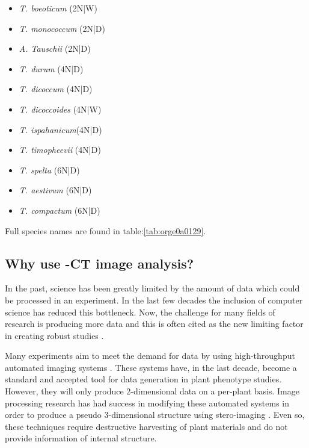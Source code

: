 \documentclass[11pt]{report}
\begin{document}
\begin{multicols}{3}

  \begin{itemize}
  \item{\textit{T. boeoticum} (2N|W)}
  \item{\textit{T. monococcum} (2N|D)}
  \item{\textit{A. Tauschii} (2N|D)}
  \end{itemize}

  \columnbreak

  \begin{itemize}
  \item{\textit{T. durum} (4N|D)}
  \item{\textit{T. dicoccum} (4N|D)}
  \item{\textit{T. dicoccoides} (4N|W)}
  \item{\textit{T. ispahanicum}(4N|D)}
  \item{\textit{T. timopheevii} (4N|D)}
  \end{itemize}

  \columnbreak

  \begin{itemize}
  \item{\textit{T. spelta} (6N|D)}
  \item{\textit{T. aestivum} (6N|D)}
  \item{\textit{T. compactum} (6N|D)}
  \end{itemize}

\end{multicols}
Full species names are found in table:\ref{tab:orge0a0129}.

\subsection{Why use \textmu{}-CT image analysis?}
\label{sec:org4d67591}
In the past, science has been greatly limited by the amount of data which could be processed in an experiment. In the last few decades the inclusion of computer science has reduced this bottleneck. Now, the challenge for many fields of research is producing more data and this is often cited as the new limiting factor in creating robust studies \cite{Furbank2011}.

Many experiments aim to meet the demand for data by using high-throughput automated imaging systems \cite{Naumann2007,Prasanna2013,Humplik2015}. These systems have, in the last decade, become a standard and accepted tool for data generation in plant phenotype studies. However, they will only produce 2-dimensional data on a per-plant basis. Image processing research has had success in modifying these automated systems in order to produce a pseudo 3-dimensional structure using stero-imaging \cite{Roussel2016}. Even so, these techniques require destructive harvesting of plant materials and do not provide information of internal structure.
\end{document}
